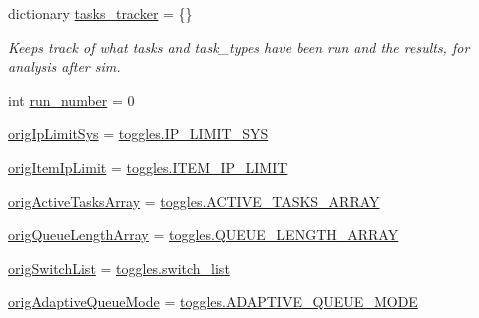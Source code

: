 \begin{DoxyCompactItemize}
\item 
dictionary \mbox{\hyperlink{classdynamicfilterapp_1_1test__simulations_1_1_simulation_test_a67cf55043194c793829d5854b43541ce}{tasks\+\_\+tracker}} = \{\}
\begin{DoxyCompactList}\small\item\em Keeps track of what tasks and task\+\_\+types have been run and the results, for analysis after sim. \end{DoxyCompactList}\item 
int \mbox{\hyperlink{classdynamicfilterapp_1_1test__simulations_1_1_simulation_test_a67ae879ef816bba6f12cf79a61bf2679}{run\+\_\+number}} = 0
\item 
\mbox{\hyperlink{classdynamicfilterapp_1_1test__simulations_1_1_simulation_test_adc00619d9e66b05d4ac5582196ec80be}{orig\+Ip\+Limit\+Sys}} = \mbox{\hyperlink{namespacedynamicfilterapp_1_1toggles_ab27926159525360b29661a4778b0ce7c}{toggles.\+I\+P\+\_\+\+L\+I\+M\+I\+T\+\_\+\+S\+YS}}
\item 
\mbox{\hyperlink{classdynamicfilterapp_1_1test__simulations_1_1_simulation_test_ab5c215fde31205b8506243914232f390}{orig\+Item\+Ip\+Limit}} = \mbox{\hyperlink{namespacedynamicfilterapp_1_1toggles_a755f2e9edbb8b4d5039a950757b9cfb2}{toggles.\+I\+T\+E\+M\+\_\+\+I\+P\+\_\+\+L\+I\+M\+IT}}
\item 
\mbox{\hyperlink{classdynamicfilterapp_1_1test__simulations_1_1_simulation_test_ac030528ad5237a1990830e18364573c4}{orig\+Active\+Tasks\+Array}} = \mbox{\hyperlink{namespacedynamicfilterapp_1_1toggles_a8f7b1e7beea29c74a7defab7d44ef294}{toggles.\+A\+C\+T\+I\+V\+E\+\_\+\+T\+A\+S\+K\+S\+\_\+\+A\+R\+R\+AY}}
\item 
\mbox{\hyperlink{classdynamicfilterapp_1_1test__simulations_1_1_simulation_test_a0a3b1ef73590c0b36a223ffac390c76e}{orig\+Queue\+Length\+Array}} = \mbox{\hyperlink{namespacedynamicfilterapp_1_1toggles_af8d4fe75258dd9f8b4c8cdb1b5b68ad1}{toggles.\+Q\+U\+E\+U\+E\+\_\+\+L\+E\+N\+G\+T\+H\+\_\+\+A\+R\+R\+AY}}
\item 
\mbox{\hyperlink{classdynamicfilterapp_1_1test__simulations_1_1_simulation_test_ab4075fb87bbe6b7e7b5b846be6c75098}{orig\+Switch\+List}} = \mbox{\hyperlink{namespacedynamicfilterapp_1_1toggles_abbafede9e00a5523a3cfea9fc4ff4764}{toggles.\+switch\+\_\+list}}
\item 
\mbox{\hyperlink{classdynamicfilterapp_1_1test__simulations_1_1_simulation_test_adc5ea4c560f297ad52d4bad2ff3aba68}{orig\+Adaptive\+Queue\+Mode}} = \mbox{\hyperlink{namespacedynamicfilterapp_1_1toggles_ae5f3a5957b65dd5d074c52ef01e0f732}{toggles.\+A\+D\+A\+P\+T\+I\+V\+E\+\_\+\+Q\+U\+E\+U\+E\+\_\+\+M\+O\+DE}}

\end{DoxyCompactItemize}
